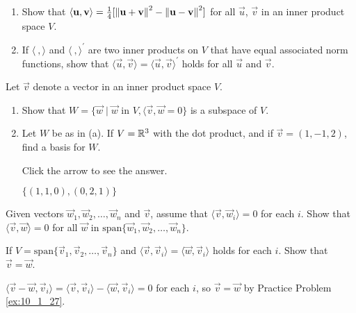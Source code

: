 \documentclass{ximera}
\begin{document}
\begin{problem}\label{prob:inner_prod_25}
\begin{enumerate} 
\item Show that $\langle \mathbf{u}, \mathbf{v} \rangle = \frac{1}{4}[\left\lVert \mathbf{u} + \mathbf{v} \right\rVert ^2 - \left\lVert \mathbf{u} - \mathbf{v} \right\rVert ^2]$ for all $\vec{u}$, $\vec{v}$ in an inner product space $V$.

\item If $\langle\ , \rangle$ and $\langle\ , \rangle^\prime$ are two inner products on $V$ that have equal associated norm functions, show that $\langle\vec{u}, \vec{v}\rangle = \langle\vec{u}, \vec{v}\rangle^\prime$ holds for all $\vec{u}$ and $\vec{v}$.

\end{enumerate}
\end{problem}

\begin{problem}\label{prob:inner_prod_26}
Let $\vec{v}$ denote a vector in an inner product space $V$.

\begin{enumerate} 
\item Show that $W = \{\vec{w} \mid \vec{w} \mbox{ in } V, \langle\vec{v}, \vec{w} = 0\}$ is a subspace of $V$.

\item Let $W$ be as in (a). If $V = \mathbb{R}^3$ with the dot product, and if $\vec{v} = (1, -1, 2)$, find a basis for $W$.

Click the arrow to see the answer.
\begin{expandable}
$\{(1, 1, 0), (0, 2, 1)\}$
\end{expandable}
\end{enumerate}
\end{problem}

\begin{problem} \label{ex:10_1_27}
Given vectors $\vec{w}_{1}, \vec{w}_{2}, \dots, \vec{w}_{n}$ and $\vec{v}$, assume that $\langle\vec{v}, \vec{w}_{i}\rangle = 0$ for each $i$. Show that $\langle\vec{v}, \vec{w}\rangle = 0$ for all $\vec{w}$ in $\mbox{span}\{\vec{w}_{1}, \vec{w}_{2}, \dots, \vec{w}_{n}\}$.
\end{problem}

\begin{problem}\label{prob:inner_prod_28}
If $V = \mbox{span}\{\vec{v}_{1}, \vec{v}_{2}, \dots, \vec{v}_{n}\}$ and $\langle\vec{v}, \vec{v}_{i}\rangle = \langle\vec{w}, \vec{v}_i\rangle$ holds for each $i$. Show that $\vec{v} = \vec{w}$.

\begin{hint}
$\langle \vec{v} - \vec{w}, \vec{v}_{i} \rangle = \langle \vec{v}, \vec{v}_{i} \rangle - \langle \vec{w}, \vec{v}_{i} \rangle = 0$ for each $i$, so $\vec{v} = \vec{w}$ by Practice Problem \ref{ex:10_1_27}.
\end{hint}
\end{problem}
\end{document}

